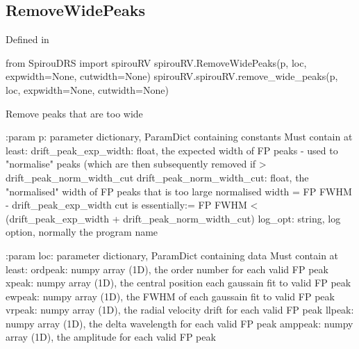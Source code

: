\noindent\begin{minipage}{\textwidth}
\subsection{RemoveWidePeaks}

Defined in \spirouRV{}

\begin{pythonbox}
from SpirouDRS import spirouRV
spirouRV.RemoveWidePeaks(p, loc, expwidth=None, cutwidth=None)
spirouRV.spirouRV.remove_wide_peaks(p, loc, expwidth=None, cutwidth=None)
\end{pythonbox}

\begin{pythondocstring}
Remove peaks that are too wide

:param p: parameter dictionary, ParamDict containing constants
    Must contain at least:
            drift_peak_exp_width: float, the expected width of FP peaks -
                                  used to "normalise" peaks (which are then
                                  subsequently removed if >
                                  drift_peak_norm_width_cut
            drift_peak_norm_width_cut: float, the "normalised" width of
                                       FP peaks that is too large
                                       normalised width = FP FWHM -
                                       drift_peak_exp_width cut is
                                       essentially:=
                                       FP FWHM < (drift_peak_exp_width +
                                       drift_peak_norm_width_cut)
            log_opt: string, log option, normally the program name

:param loc: parameter dictionary, ParamDict containing data
        Must contain at least:
            ordpeak: numpy array (1D), the order number for each valid FP
                     peak
            xpeak: numpy array (1D), the central position each gaussain fit
                   to valid FP peak
            ewpeak: numpy array (1D), the FWHM of each gaussain fit
                    to valid FP peak
            vrpeak: numpy array (1D), the radial velocity drift for each
                    valid FP peak
            llpeak: numpy array (1D), the delta wavelength for each valid
                    FP peak
            amppeak: numpy array (1D), the amplitude for each valid FP peak


\end{pythondocstring}
\end{minipage}

